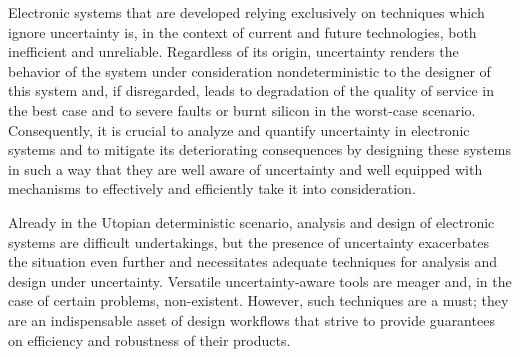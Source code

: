 Electronic systems that are developed relying exclusively on techniques which
ignore uncertainty is, in the context of current and future technologies, both
inefficient and unreliable. Regardless of its origin, uncertainty renders the
behavior of the system under consideration nondeterministic to the designer of
this system and, if disregarded, leads to degradation of the quality of service
in the best case and to severe faults or burnt silicon in the worst-case
scenario. Consequently, it is crucial to analyze and quantify uncertainty in
electronic systems and to mitigate its deteriorating consequences by designing
these systems in such a way that they are well aware of uncertainty and well
equipped with mechanisms to effectively and efficiently take it into
consideration.

Already in the Utopian deterministic scenario, analysis and design of electronic
systems are difficult undertakings, but the presence of uncertainty exacerbates
the situation even further and necessitates adequate techniques for analysis and
design under uncertainty. Versatile uncertainty-aware tools are meager and, in
the case of certain problems, non-existent. However, such techniques are a must;
they are an indispensable asset of design workflows that strive to provide
guarantees on efficiency and robustness of their products.
